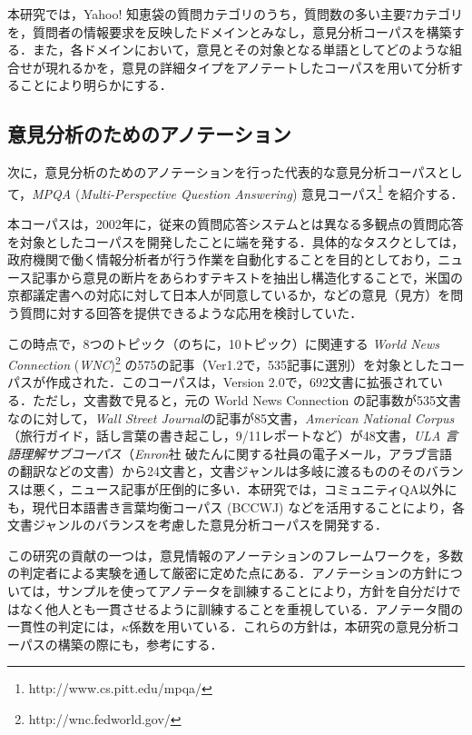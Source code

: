 \documentclass[japanese]{jnlp_1.4}
\begin{document}
本研究では，Yahoo! 知恵袋の質問カテゴリのうち，質問数の多い主要7カテゴリを，質問者の情報要求を反映したドメインとみなし，意見分析コーパスを構築する．また，各ドメインにおいて，意見とその対象となる単語としてどのような組合せが現れるかを，意見の詳細タイプをアノテートしたコーパスを用いて分析することにより明らかにする．


\subsection{意見分析のためのアノテーション}
\label{subsec:mpqa}

次に，意見分析のためのアノテーションを行った代表的な意見分析コーパスとして，{\it MPQA} ({\it Multi-Perspective Question Answering}) 意見コーパス\footnote{http://www.cs.pitt.edu/mpqa/} を紹介する．

本コーパスは，2002年に，従来の質問応答システムとは異なる多観点の質問応答を対象としたコーパスを開発したことに端を発する\cite{wiebe2002mpqa}．具体的なタスクとしては，政府機関で働く情報分析者が行う作業を自動化することを目的としており，ニュース記事から意見の断片をあらわすテキストを抽出し構造化することで，米国の京都議定書への対応に対して日本人が同意しているか，などの意見（見方）を問う質問に対する回答を提供できるような応用を検討していた．

この時点で，8つのトピック（のちに，10トピック）に関連する {\it World News Connection} (\textit{WNC})\footnote{http://wnc.fedworld.gov/} の575の記事（Ver1.2で，535記事に選別）を対象としたコーパスが作成された．このコーパスは，Version 2.0で，692文書に拡張されている．ただし，文書数で見ると，元の World News Connection の記事数が535文書なのに対して，{\it Wall Street Journal}の記事が85文書，{\it American National Corpus} （旅行ガイド，話し言葉の書き起こし，9/11レポートなど）が48文書，{\it ULA 言語理解サブコーパス}（{\it Enron}社 破たんに関する社員の電子メール，アラブ言語の翻訳などの文書）から24文書と，文書ジャンルは多岐に渡るもののそのバランスは悪く，ニュース記事が圧倒的に多い．本研究では，コミュニティQA以外にも，現代日本語書き言葉均衡コーパス (BCCWJ) などを活用することにより，各文書ジャンルのバランスを考慮した意見分析コーパスを開発する．

この研究の貢献の一つは，意見情報のアノーテションのフレームワークを，多数の判定者による実験を通して厳密に定めた点にある\cite{wiebe2005lre}．アノテーションの方針については，サンプルを使ってアノテータを訓練することにより，方針を自分だけではなく他人とも一貫させるように訓練することを重視している．アノテータ間の一貫性の判定には，$\kappa$係数\cite{cohen1960}を用いている．これらの方針は，本研究の意見分析コーパスの構築の際にも，参考にする．
\end{document}
